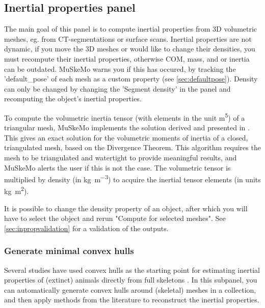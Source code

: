 \documentclass{article}
\begin{document}
\subsection{Inertial properties panel}
\label{sec:inproppanel}

The main goal of this panel is to compute inertial properties from 3D volumetric meshes, eg. from CT-segmentations or surface scans.
Inertial properties are not dynamic, if you move the 3D meshes or would like to change their densities, you must recompute their inertial properties, otherwise COM, mass, and or inertia can be outdated. MuSkeMo warns you if this has occured, by tracking the 'default\_pose' of each mesh as a custom property (see \ref{sec:defaultpose}). Density can only be changed by changing the 'Segment density' in the panel and recomputing the object's inertial properties.

To compute the volumetric inertia tensor (with elements in the unit \si{m^5}) of a triangular mesh, MuSkeMo implements the solution derived and presented in \cite{eberlyGamePhysics2004}. This gives an exact solution for the volumetric moments of inertia of a closed, triangulated mesh, based on the Divergence Theorem. This algorithm requires the mesh to be triangulated and watertight to provide meaningful results, and MuSkeMo alerts the user if this is not the case. The volumetric tensor is multiplied by density (in \si{kg m^{-3}}) to acquire the inertial tensor elements (in units \si{kg m^2}). 

It is possible to change the density property of an object, after which you will have to select the object and rerun "Compute for selected meshes". See \ref{sec:inpropvalidation} for a validation of the outputs.

\subsubsection{Generate minimal convex hulls}
Several studies have used convex hulls as the starting point for estimating inertial properties of (extinct) animals directly from full skeletons \cite{sellersMinimumConvexHull2012,brasseyScalingConvexHull2014,brasseyConvexhullMassEstimates2016,brasseyVolumetricTechniqueFossil2018,coathamConvexHullEstimation2021,macaulayDecouplingBodyShape2023,wrightVolumetricElementscalingMass2024,batesRunningPerformanceAustralopithecus2025}.
In this subpanel, you can automatically generate convex hulls around (skeletal) meshes in a collection, and then apply methods from the literature to reconstruct the inertial properties.
\end{document}
